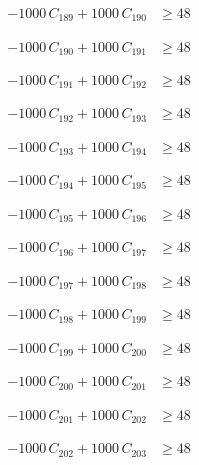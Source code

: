 \documentclass[a4paper,11pt]{article}
\begin{document}
\begin{align}
-1000\,C_{189} + 1000\,C_{190} &\geq 48 \nonumber
\end{align}

\begin{align}
-1000\,C_{190} + 1000\,C_{191} &\geq 48 \nonumber
\end{align}

\begin{align}
-1000\,C_{191} + 1000\,C_{192} &\geq 48 \nonumber
\end{align}

\begin{align}
-1000\,C_{192} + 1000\,C_{193} &\geq 48 \nonumber
\end{align}

\begin{align}
-1000\,C_{193} + 1000\,C_{194} &\geq 48 \nonumber
\end{align}

\begin{align}
-1000\,C_{194} + 1000\,C_{195} &\geq 48 \nonumber
\end{align}

\begin{align}
-1000\,C_{195} + 1000\,C_{196} &\geq 48 \nonumber
\end{align}

\begin{align}
-1000\,C_{196} + 1000\,C_{197} &\geq 48 \nonumber
\end{align}

\begin{align}
-1000\,C_{197} + 1000\,C_{198} &\geq 48 \nonumber
\end{align}

\begin{align}
-1000\,C_{198} + 1000\,C_{199} &\geq 48 \nonumber
\end{align}

\begin{align}
-1000\,C_{199} + 1000\,C_{200} &\geq 48 \nonumber
\end{align}

\begin{align}
-1000\,C_{200} + 1000\,C_{201} &\geq 48 \nonumber
\end{align}

\begin{align}
-1000\,C_{201} + 1000\,C_{202} &\geq 48 \nonumber
\end{align}

\begin{align}
-1000\,C_{202} + 1000\,C_{203} &\geq 48 \nonumber
\end{align}
\end{document}
